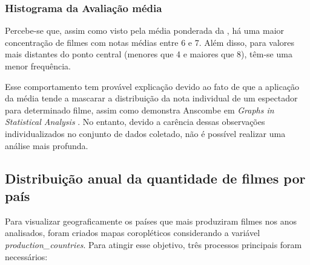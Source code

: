 \subsubsection{Histograma da Avaliação média}
%
Percebe-se que, assim como visto pela média ponderada da , há uma maior concentração de filmes com notas médias entre 6 e 7. Além disso, para valores mais distantes do ponto central (menores que 4 e maiores que 8), têm-se uma menor frequência. 

Esse comportamento tem provável explicação devido ao fato de que a aplicação da média tende a mascarar a distribuição da nota individual de um espectador para determinado filme, assim como demonstra Anscombe em \textit{Graphs in Statistical Analysis} \cite{anscombe}. No entanto, devido a carência dessas observações individualizados no conjunto de dados coletado, não é possível realizar uma análise mais profunda. 


\subsection{Distribuição anual da quantidade de filmes por país}\label{chropleth-year-country}
Para visualizar geograficamente os países que mais produziram filmes nos anos analisados, foram criados mapas coropléticos considerando a variável \textit{production\_countries}. Para atingir esse objetivo, três processos principais foram necessários:

